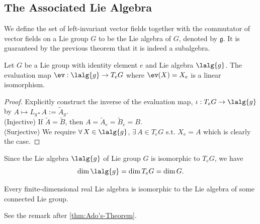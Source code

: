 \documentclass[../main.tex]{subfiles}
\begin{document}
\subsection{The Associated Lie Algebra}
\begin{definition}\label{def:Lie-Algebra-of-a-Lie-Group}
    We define the set of left-invariant vector fields together with the commutator of vector fields on a Lie group \(G\) to be the Lie algebra of \(G\), denoted by \(\mathfrak{g}\).
    It is guaranteed by the previous theorem that it is indeed a subalgebra.
\end{definition}
\newpage
\begin{theorem}\label{thm:Lie-Algebra-and-Tangent-Space}
    Let \(G\) be a Lie group with identity element \(e\) and Lie algebra
    \(\lalg{g}\). The evaluation map \(\ev : \lalg{g} \to T_eG\) where \(\ev(X) = X_e\) is a linear isomorphism.
\end{theorem}
\begin{proof}
    Explicitly construct the inverse of the evaluation map, 
    \(\iota : T_eG \to \lalg{g}\) by \(A \mapsto L_{g*}A :=
    \tilde{A}_g\).\\
    (Injective) If \(\tilde{A} = \tilde{B}\), then \(A = \tilde{A}_e =
    \tilde{B}_e = B\).\\
    (Surjective) We require \(\forall\, X \in \lalg{g}\), \(\exists\, A \in
    T_eG\) s.t. \(X_e = A\) which is clearly the case.
\end{proof}
\begin{corollary}\label{cor:Dimension-of-Lie-Algebra}
    Since the Lie algebra \(\lalg{g}\) of Lie group \(G\) is isomorphic to \(T_eG\), we have
    \[
        \dim \lalg{g} = \dim T_eG = \dim G.
    \]
\end{corollary}
\begin{theorem}\label{thm:Lie's-Third-Theorem}
    Every finite-dimensional real Lie algebra is isomorphic to the Lie algebra of some connected Lie group.
\end{theorem}
\begin{remark}
    See the remark after \cref{thm:Ado's-Theorem}.
\end{remark}
\end{document}
